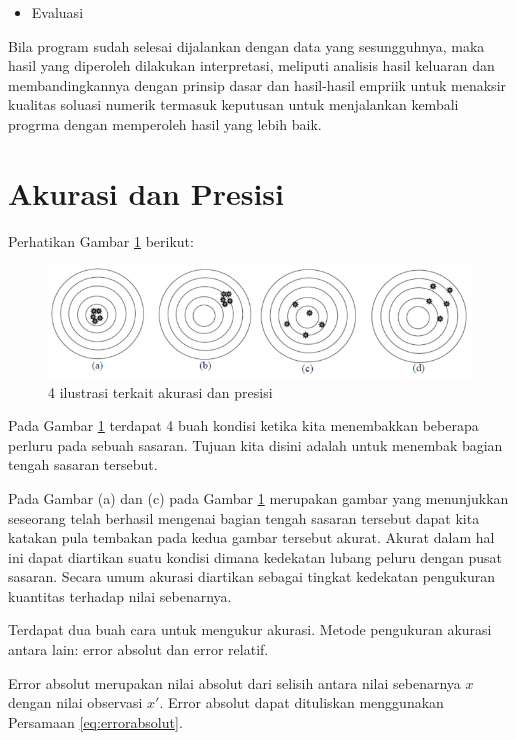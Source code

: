 \documentclass[]{book}
\providecommand{\tightlist}{%
  \setlength{\itemsep}{0pt}\setlength{\parskip}{0pt}}
\theoremstyle{definition}
\theoremstyle{definition}
\theoremstyle{definition}
\theoremstyle{remark}
\begin{document}
\begin{itemize}
\tightlist
\item
  Evaluasi
\end{itemize}

Bila program sudah selesai dijalankan dengan data yang sesungguhnya, maka hasil yang diperoleh dilakukan interpretasi, meliputi analisis hasil keluaran dan membandingkannya dengan prinsip dasar dan hasil-hasil empriik untuk menaksir kualitas soluasi numerik termasuk keputusan untuk menjalankan kembali progrma dengan memperoleh hasil yang lebih baik.

\hypertarget{acuracy}{%
\section{Akurasi dan Presisi}\label{acuracy}}

Perhatikan Gambar \ref{fig:akurasi} berikut:

\begin{figure}

{\centering \includegraphics[width=0.75\linewidth]{./images/akurasi} 

}

\caption{4 ilustrasi terkait akurasi dan presisi}\label{fig:akurasi}
\end{figure}

Pada Gambar \ref{fig:akurasi} terdapat 4 buah kondisi ketika kita menembakkan beberapa perluru pada sebuah sasaran. Tujuan kita disini adalah untuk menembak bagian tengah sasaran tersebut.

Pada Gambar (a) dan (c) pada Gambar \ref{fig:akurasi} merupakan gambar yang menunjukkan seseorang telah berhasil mengenai bagian tengah sasaran tersebut dapat kita katakan pula tembakan pada kedua gambar tersebut akurat. Akurat dalam hal ini dapat diartikan suatu kondisi dimana kedekatan lubang peluru dengan pusat sasaran. Secara umum akurasi diartikan sebagai tingkat kedekatan pengukuran kuantitas terhadap nilai sebenarnya.

Terdapat dua buah cara untuk mengukur akurasi. Metode pengukuran akurasi antara lain: error absolut dan error relatif.

Error absolut merupakan nilai absolut dari selisih antara nilai sebenarnya \(x\) dengan nilai observasi \(x'\). Error absolut dapat dituliskan menggunakan Persamaan \eqref{eq:errorabsolut}.
\end{document}
